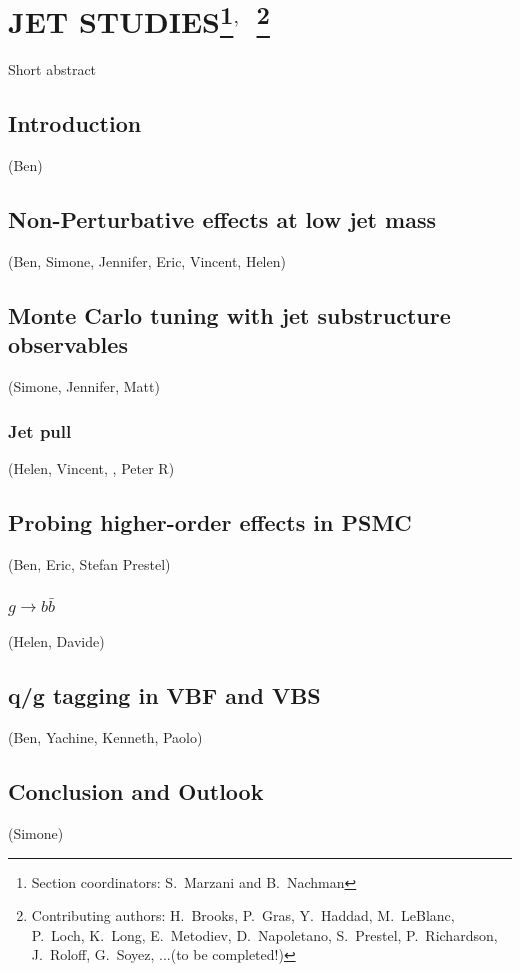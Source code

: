 \documentclass[11pt]{cernrep}
\begin{document}
\section{JET STUDIES\protect\footnote{Section coordinators: S.~Marzani and B.~Nachman}$^{,}$~\protect\footnote{Contributing authors: H.~Brooks, P.~Gras, Y.~Haddad, M.~LeBlanc, P.~Loch, K.~Long, E.~Metodiev, D.~Napoletano, S.~Prestel, P.~Richardson, J.~Roloff, G.~Soyez, ...(to be completed!)}}

Short abstract

\subsection{Introduction}
(Ben)

\subsection{Non-Perturbative effects at low jet mass}
(Ben, Simone, Jennifer, Eric, Vincent, Helen)
\subsection{Monte Carlo tuning with jet substructure observables}
(Simone, Jennifer, Matt)
\subsubsection{Jet pull}
(Helen, Vincent, , Peter R)

\subsection{Probing higher-order effects in PSMC}
(Ben, Eric, Stefan Prestel)
\subsubsection{$g\to b \bar b$}
(Helen, Davide)


\subsection{q/g tagging in VBF and VBS}
(Ben, Yachine, Kenneth, Paolo)




\subsection{Conclusion and Outlook}
(Simone)
\end{document}
